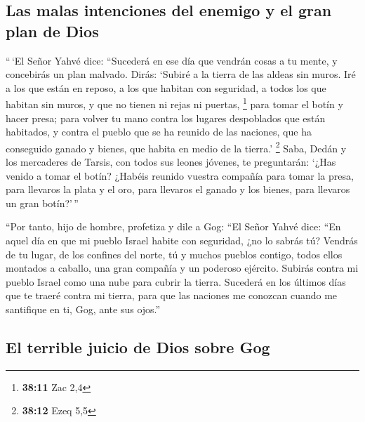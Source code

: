\hypertarget{las-malas-intenciones-del-enemigo-y-el-gran-plan-de-dios}{%
\subsection{Las malas intenciones del enemigo y el gran plan de
Dios}\label{las-malas-intenciones-del-enemigo-y-el-gran-plan-de-dios}}

 ``\,`El Señor Yahvé dice: ``Sucederá en ese día que
vendrán cosas a tu mente, y concebirás un plan malvado. 
Dirás: `Subiré a la tierra de las aldeas sin muros. Iré a los que están
en reposo, a los que habitan con seguridad, a todos los que habitan sin
muros, y que no tienen ni rejas ni puertas, \footnote{\textbf{38:11} Zac
  2,4}  para tomar el botín y hacer presa; para volver tu
mano contra los lugares despoblados que están habitados, y contra el
pueblo que se ha reunido de las naciones, que ha conseguido ganado y
bienes, que habita en medio de la tierra.' \footnote{\textbf{38:12} Ezeq
  5,5}  Saba, Dedán y los mercaderes de Tarsis, con todos
sus leones jóvenes, te preguntarán: `¿Has venido a tomar el botín?
¿Habéis reunido vuestra compañía para tomar la presa, para llevaros la
plata y el oro, para llevaros el ganado y los bienes, para llevaros un
gran botín?'\,''

 ``Por tanto, hijo de hombre, profetiza y dile a Gog:
``El Señor Yahvé dice: ``En aquel día en que mi pueblo Israel habite con
seguridad, ¿no lo sabrás tú?  Vendrás de tu lugar, de los
confines del norte, tú y muchos pueblos contigo, todos ellos montados a
caballo, una gran compañía y un poderoso ejército. 
Subirás contra mi pueblo Israel como una nube para cubrir la tierra.
Sucederá en los últimos días que te traeré contra mi tierra, para que
las naciones me conozcan cuando me santifique en ti, Gog, ante sus
ojos.''

\hypertarget{el-terrible-juicio-de-dios-sobre-gog}{%
\subsection{El terrible juicio de Dios sobre
Gog}\label{el-terrible-juicio-de-dios-sobre-gog}}

